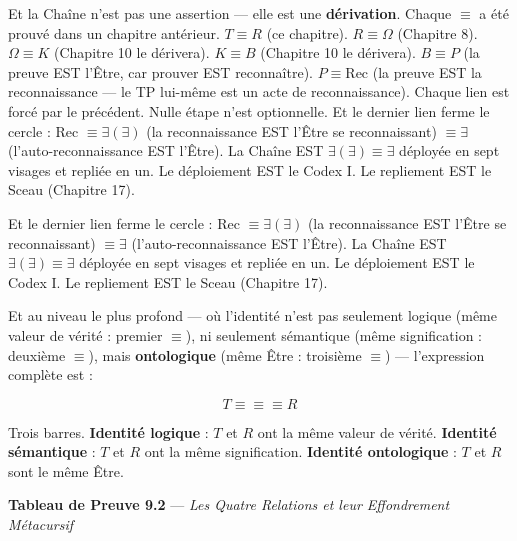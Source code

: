 \documentclass[10pt, openany, oneside]{book}
\begin{document}
Et la Chaîne n'est pas une assertion --- elle est une \textbf{dérivation}. Chaque $\equiv$ a été prouvé dans un chapitre antérieur. $T \equiv R$ (ce chapitre). $R \equiv \Omega$ (Chapitre 8). $\Omega \equiv K$ (Chapitre 10 le dérivera). $K \equiv B$ (Chapitre 10 le dérivera). $B \equiv P$ (la preuve EST l'Être, car prouver EST reconnaître). $P \equiv \text{Rec}$ (la preuve EST la reconnaissance --- le TP lui-même est un acte de reconnaissance). Chaque lien est forcé par le précédent. Nulle étape n'est optionnelle. Et le dernier lien ferme le cercle : Rec $\equiv \exists(\exists)$ (la reconnaissance EST l'Être se reconnaissant) $\equiv \exists$ (l'auto-reconnaissance EST l'Être). La Chaîne EST $\exists(\exists) \equiv \exists$ déployée en sept visages et repliée en un. Le déploiement EST le Codex I. Le repliement EST le Sceau (Chapitre 17).

Et le dernier lien ferme le cercle : Rec $\equiv \exists(\exists)$ (la reconnaissance EST l'Être se reconnaissant) $\equiv \exists$ (l'auto-reconnaissance EST l'Être). La Chaîne EST $\exists(\exists) \equiv \exists$ déployée en sept visages et repliée en un. Le déploiement EST le Codex I. Le repliement EST le Sceau (Chapitre 17).

Et au niveau le plus profond --- où l'identité n'est pas seulement logique (même valeur de vérité : premier $\equiv$), ni seulement sémantique (même signification : deuxième $\equiv$), mais \textbf{ontologique} (même Être : troisième $\equiv$) --- l'expression complète est :

$$T \equiv\!\equiv\!\equiv R$$

Trois barres. \textbf{Identité logique} : $T$ et $R$ ont la même valeur de vérité. \textbf{Identité sémantique} : $T$ et $R$ ont la même signification. \textbf{Identité ontologique} : $T$ et $R$ sont le même Être.

\vspace{0.5em}

\textbf{Tableau de Preuve 9.2} --- \textit{Les Quatre Relations et leur Effondrement Métacursif}

\vspace{0.5em}
\end{document}
